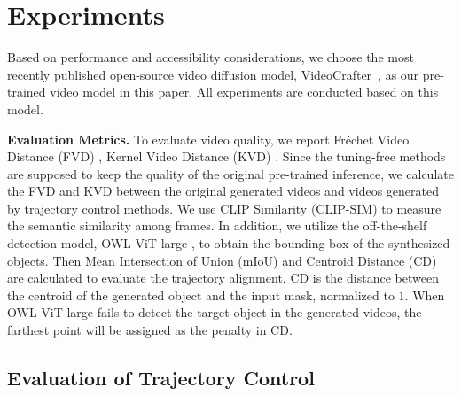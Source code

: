 \section{Experiments}
\label{experiments}

Based on performance and accessibility considerations, we choose the most recently published open-source video diffusion model, VideoCrafter~\citep{chen2024videocrafter2}, as our pre-trained video model in this paper. All experiments are conducted based on this model.

\noindent\textbf{Evaluation Metrics.} To evaluate video quality, we report Fréchet Video Distance (FVD) \citep{unterthiner2018towards}, Kernel Video Distance (KVD) \citep{kvd}. Since the tuning-free methods are supposed to keep the quality of the original pre-trained inference, we calculate the FVD and KVD between the original generated videos and videos generated by trajectory control methods. We use CLIP Similarity (CLIP-SIM) \citep{radford2021learning} to measure the semantic similarity among frames. In addition, we utilize the off-the-shelf detection model, OWL-ViT-large \citep{minderer2022simple}, to obtain the bounding box of the synthesized objects. Then Mean Intersection of Union (mIoU) and Centroid Distance (CD) are calculated to evaluate the trajectory alignment. CD is the distance between the centroid of the generated object and the input mask, normalized to $1$. When OWL-ViT-large fails to detect the target object in the generated videos, the farthest point will be assigned as the penalty in CD.

\subsection{Evaluation of Trajectory Control}

